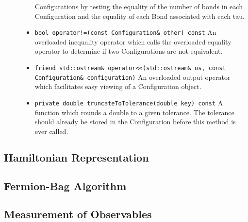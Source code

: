 \begin{description}
\begin{itemize}
        Configurations by testing the equality of the number of bonds in each
        Configuration and the equality of each Bond associated with each tau.
      \item \texttt{bool operator!=(const Configuration\& other) const}
        An overloaded inequality operator which calls the overloaded equality 
        operator to determine if two Configurations are not equivalent.
      \item \texttt{friend std::ostream\& operator<<(std::ostream\& os, const Configuration\& configuration)}
        An overloaded output operator which facilitates easy viewing of a 
        Configuration object.
      \item \texttt{private double truncateToTolerance(double key) const}
        A function which rounds a double to a given tolerance. 
        The tolerance should already be stored in the Configuration before this
        method is ever called.
    \end{itemize}
\end{description}


\subsection{Hamiltonian Representation}


\subsection{Fermion-Bag Algorithm}


\subsection{Measurement of Observables}